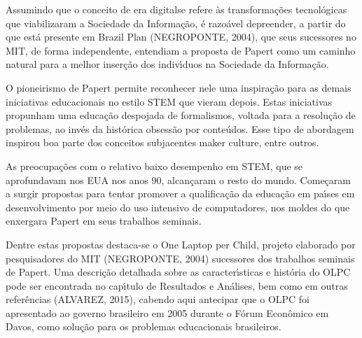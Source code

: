 \documentclass[
12pt,		%
openright,	%
twoside,  %
a4paper,			%
chapter=TITLE,		%
english,			%
french,				%
spanish,			%
brazil				%
]{USPSC-classe/USPSC}
\begin{document}
Assumindo que o conceito de \textquotedbl era digital\textquotedbl  se refere \`as transforma\c{c}\~oes tecnol\'ogicas que viabilizaram a  \textquotedbl Sociedade da Informa\c{c}\~ao\textquotedbl ,  \'e razo\'avel depreender, a partir do que est\'a presente em Brazil Plan  (NEGROPONTE, 2004), que seus sucessores no MIT, de forma independente, entendiam a proposta de Papert como um caminho natural para a melhor inser\c{c}\~ao dos indiv\'{\i}duos na Sociedade da Informa\c{c}\~ao.

















O pioneirismo de Papert permite reconhecer nele uma inspira\c{c}\~ao para as demais iniciativas educacionais no estilo STEM que vieram depois. Estas iniciativas propunham uma educa\c{c}\~ao despojada de formalismos, voltada para a resolu\c{c}\~ao de problemas, ao inv\'es da hist\'orica obsess\~ao por conte\'udos. Esse tipo de abordagem inspirou boa parte dos conceitos subjacentes  \textquotedbl maker culture\textquotedbl , entre outros.

















As preocupa\c{c}\~oes com o relativo baixo desempenho em STEM, que se aprofundavam nos EUA nos anos 90, alcan\c{c}aram o resto do mundo. Come\c{c}aram a surgir propostas para tentar promover a qualifica\c{c}\~ao da educa\c{c}\~ao em pa\'{\i}ses em desenvolvimento por meio do uso intensivo de computadores, nos moldes do que enxergara Papert em seus trabalhos seminais.

















Dentre estas propostas destaca-se o \textquotedbl One Laptop per Child\textquotedbl , projeto elaborado por pesquisadores do MIT  (NEGROPONTE, 2004)  sucessores dos trabalhos seminais de Papert. Uma descri\c{c}\~ao detalhada sobre as caracter\'{\i}sticas e hist\'oria do OLPC pode ser encontrada no cap\'{\i}tulo de Resultados e An\'alises, bem como em outras refer\^encias  (ALVAREZ, 2015), cabendo aqui antecipar que o OLPC foi apresentado ao governo brasileiro em 2005 durante o F\'orum Econ\^omico em Davos, como solu\c{c}\~ao para os problemas educacionais brasileiros.
\end{document}
